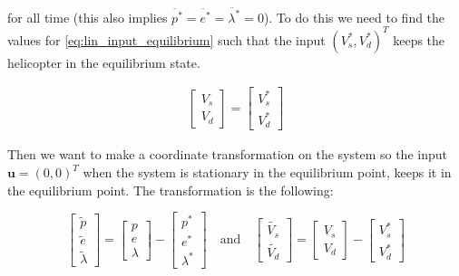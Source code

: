  for all time (this also implies $\ddot{p^*} = \ddot{e^*} = \ddot{\lambda^*} = 0$). To do this we need to find the values for \cref{eq:lin_input_equilibrium} such that the input $(V_s^*, V_d^*)^T$ keeps the helicopter in the equilibrium state.

\begin{equation}\label{eq:lin_input_equilibrium}
    \begin{aligned}
        \begin{bmatrix} V_{s} \\ V_{d} \end{bmatrix}
        =
        \begin{bmatrix} V_{s}^* \\ V_{d}^* \end{bmatrix}
    \end{aligned}
\end{equation}


Then we want to make a coordinate transformation on the system so the input $\mathbf{u} = (0, 0)^T$ when the system is stationary in the equilibrium point, keeps it in the equilibrium point. The transformation is the following:


\begin{equation}\label{eq:coordinate_transform}
    \begin{bmatrix} \tilde{p} \\ \tilde{e} \\ \tilde{\lambda} \end{bmatrix}
    =
    \begin{bmatrix} p \\ e \\ \lambda \end{bmatrix}
    -
    \begin{bmatrix} p^* \\ e^* \\ \lambda^* \end{bmatrix}
    \quad \textrm{and} \quad
    \begin{bmatrix} \tilde{V_{s}} \\ \tilde{V_{d}} \end{bmatrix}
    =
    \begin{bmatrix} V_{s} \\ V_{d} \end{bmatrix}
    -
    \begin{bmatrix} V_{s}^* \\ V_{d}^* \end{bmatrix}
\end{equation}

